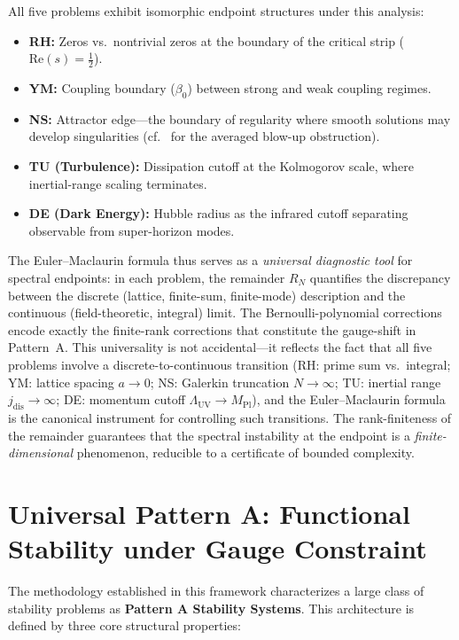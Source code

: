 \documentclass[12pt,a4paper]{article}
\theoremstyle{definition}
\theoremstyle{remark}
\begin{document}
All five problems exhibit isomorphic endpoint structures under this analysis:
\begin{itemize}
    \item \textbf{RH:} Zeros vs.\ nontrivial zeros at the boundary of the critical strip ($\mathrm{Re}(s)=\tfrac{1}{2}$).
    \item \textbf{YM:} Coupling boundary ($\beta_0$) between strong and weak coupling regimes.
    \item \textbf{NS:} Attractor edge---the boundary of regularity where smooth solutions may develop singularities (cf.~\cite{Tao2016} for the averaged blow-up obstruction).
    \item \textbf{TU (Turbulence):} Dissipation cutoff at the Kolmogorov scale, where inertial-range scaling terminates.
    \item \textbf{DE (Dark Energy):} Hubble radius as the infrared cutoff separating observable from super-horizon modes.
\end{itemize}

\noindent
The Euler--Maclaurin formula thus serves as a \emph{universal diagnostic tool}
for spectral endpoints: in each problem, the remainder $R_N$ quantifies
the discrepancy between the discrete (lattice, finite-sum, finite-mode)
description and the continuous (field-theoretic, integral) limit. The
Bernoulli-polynomial corrections encode exactly the finite-rank corrections
that constitute the gauge-shift in Pattern~A. This universality is not
accidental---it reflects the fact that all five problems involve a
discrete-to-continuous transition (RH: prime sum vs.\ integral;
YM: lattice spacing $a \to 0$; NS: Galerkin truncation $N \to \infty$;
TU: inertial range $j_{\mathrm{dis}} \to \infty$;
DE: momentum cutoff $\Lambda_{\mathrm{UV}} \to M_{\mathrm{Pl}}$),
and the Euler--Maclaurin formula is the canonical instrument for
controlling such transitions. The rank-finiteness of the remainder
guarantees that the spectral instability at the endpoint is a
\emph{finite-dimensional} phenomenon, reducible to a certificate
of bounded complexity.

\section{Universal Pattern A: Functional Stability under Gauge Constraint}
\label{sec:pattern-a}

The methodology established in this framework characterizes a large class of stability problems as \textbf{Pattern A Stability Systems}. This architecture is defined by three core structural properties:
\end{document}
